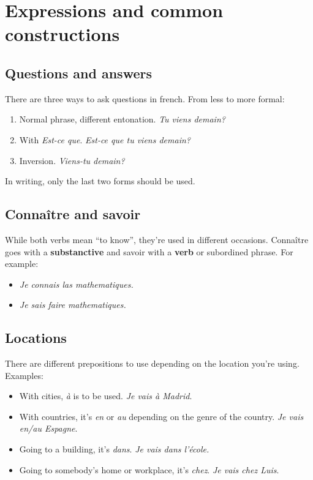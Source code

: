 \documentclass[palatino]{nicenotes}
\begin{document}
\section{Expressions and common constructions}

\subsection{Questions and answers}

There are three ways to ask questions in french. From less to more formal:

\begin{enumerate}
\item Normal phrase, different entonation. \textit{Tu viens demain?}
\item With \textit{Est-ce que}. \textit{Est-ce que tu viens demain?}
\item Inversion. \textit{Viens-tu demain?}
\end{enumerate}

In writing, only the last two forms should be used.

\subsection{Connaître and savoir}

While both verbs mean ``to know'', they're used in different occasions. Connaître goes with a \textbf{substanctive} and savoir with a \textbf{verb} or subordined phrase. For example:

\begin{itemize}
\item \textit{Je connais las mathematiques.}
\item \textit{Je sais faire mathematiques.}
\end{itemize}

\subsection{Locations}

There are different prepositions to use depending on the location you're using. Examples:

\begin{itemize}
\item With cities, \textit{à} is to be used. \textit{Je vais à Madrid}.
\item With countries, it's \textit{en} or \textit{au} depending on the genre of the country. \textit{Je vais en/au Espagne}.
\item Going to a building, it's \textit{dans}. \textit{Je vais dans l'école.}
\item Going to somebody's home or workplace, it's \textit{chez}. \textit{Je vais chez Luis}.
\end{itemize}
\end{document}
